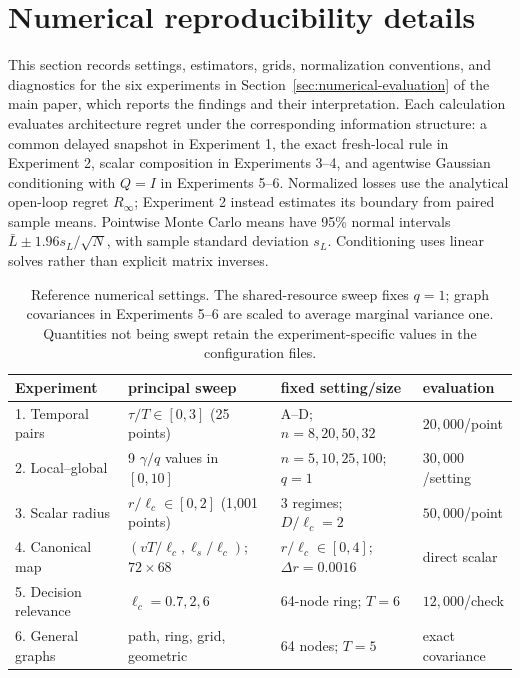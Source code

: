 \section{Numerical reproducibility details}
\label{supp:numerics}
This section records settings, estimators, grids, normalization conventions,
and diagnostics for the six experiments in Section~\ref{sec:numerical-evaluation}
of the main paper, which reports the findings and their interpretation.
Each calculation evaluates architecture regret under the corresponding
information structure: a common delayed snapshot in Experiment 1, the exact
fresh-local rule in Experiment 2, scalar composition in Experiments 3--4,
and agentwise Gaussian conditioning with $Q=I$ in Experiments 5--6.
Normalized losses use the analytical open-loop regret $R_\infty$;
Experiment 2 instead estimates its boundary from paired sample means.
Pointwise Monte Carlo means have 95\% normal intervals
$\bar L\pm1.96s_L/\sqrt N$, with sample standard deviation $s_L$.
Conditioning uses linear solves rather than explicit matrix inverses.

\begin{table}[H]
\centering
\caption{Reference numerical settings. The shared-resource sweep fixes $q=1$;
graph covariances in Experiments 5--6 are scaled to average marginal variance
one. Quantities not being swept retain the experiment-specific values in the
configuration files.}
\label{tab:numerical-parameters}
\small
\begin{tabular}{llll}
\toprule
Experiment & principal sweep & fixed setting/size & evaluation \\
\midrule
1. Temporal pairs & $\tau/T\in[0,3]$ (25 points) & A--D; $n=8,20,50,32$ & $20{,}000$/point \\
2. Local--global & 9 $\gamma/q$ values in $[0,10]$ & $n=5,10,25,100$; $q=1$ & $30{,}000$/setting \\
3. Scalar radius & $r/\ell_c\in[0,2]$ (1,001 points) & 3 regimes; $D/\ell_c=2$ & $50{,}000$/point \\
4. Canonical map & $(vT/\ell_c,\ell_s/\ell_c)$; $72\times68$ & $r/\ell_c\in[0,4]$; $\Delta r=0.0016$ & direct scalar \\
5. Decision relevance & $\ell_c=0.7,2,6$ & 64-node ring; $T=6$ & $12{,}000$/check \\
6. General graphs & path, ring, grid, geometric & 64 nodes; $T=5$ & exact covariance \\
\bottomrule
\end{tabular}
\end{table}

